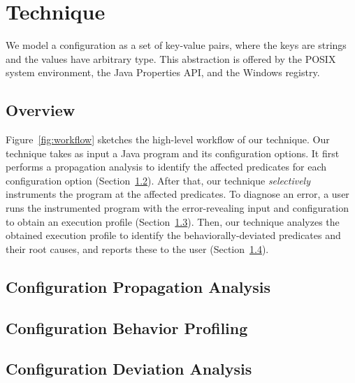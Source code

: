 \section{Technique}
\label{sec:technique}
\tinysqueeze

We model a configuration as a set of key-value pairs, where
the keys are strings and the values have arbitrary type. This
abstraction is offered
by the POSIX system environment, the Java Properties API,
and the Windows registry.


\tinysqueeze
\subsection{Overview}
\tinysqueeze

Figure~\ref{fig:workflow} sketches the high-level workflow of our technique.
Our technique takes as input a Java program and its configuration options.
It first performs a propagation analysis to identify
the affected predicates for each configuration option (Section~\ref{sec:prop}).
After that, our technique \textit{selectively} instruments
the program at the affected predicates. 
To diagnose an error, a user runs the instrumented program
with the error-revealing input and configuration
to obtain an execution profile (Section~\ref{sec:profiling}).
Then, our technique analyzes the obtained execution profile
to identify the behaviorally-deviated predicates and their
root causes, and reports these to the user (Section~\ref{sec:analysis}).



\tinysqueeze

\subsection{Configuration Propagation Analysis}
\label{sec:prop}
\tinysqueeze


\tinysqueeze
\subsection{Configuration Behavior Profiling}
\label{sec:profiling}
\tinysqueeze



\tinysqueeze

\subsection{Configuration Deviation Analysis}
\label{sec:analysis}
\tinysqueeze



